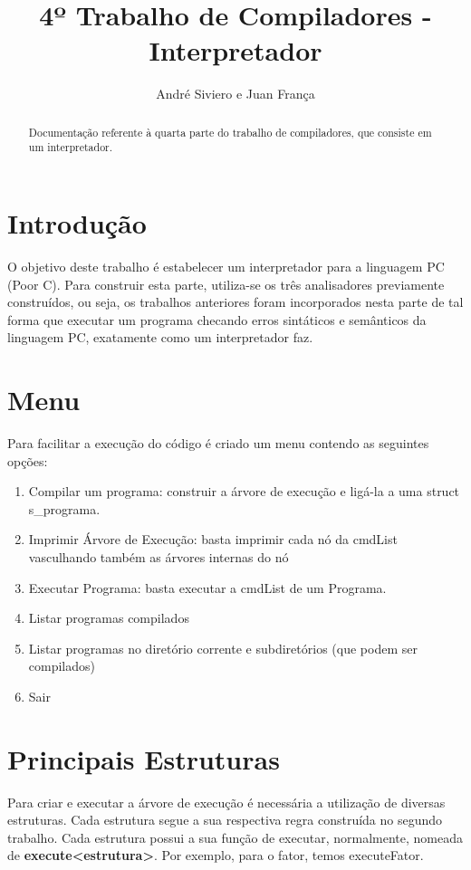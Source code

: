 \documentclass[a4paper,10pt]{article}
\title{4º Trabalho de Compiladores - Interpretador}
\author{André Siviero e Juan França}
\begin{document}
\maketitle

\begin{abstract}
Documentação referente à quarta parte do trabalho de compiladores, que consiste em um interpretador.
\end{abstract}

\section{Introdução}
O objetivo deste trabalho é estabelecer um interpretador para a linguagem PC (Poor C). Para construir esta parte, utiliza-se os três analisadores previamente construídos, ou seja,
os trabalhos anteriores foram incorporados nesta parte de tal forma que executar um programa checando erros sintáticos e semânticos da linguagem PC, exatamente como um interpretador faz.

\section{Menu}

Para facilitar a execução do código é criado um menu contendo as seguintes opções:

\begin{enumerate}
 \item Compilar um programa: construir a árvore de execução e ligá-la a uma struct s\_programa.
 \item Imprimir Árvore de Execução: basta imprimir cada nó da cmdList vasculhando também as árvores internas do nó
 \item Executar Programa: basta executar a cmdList de um Programa. 
 \item Listar programas compilados
 \item Listar programas no diretório corrente e subdiretórios (que podem ser compilados)
 \item Sair
\end{enumerate}

\section{Principais Estruturas}

Para criar e executar a árvore de execução é necessária a utilização de diversas estruturas. Cada estrutura segue a sua respectiva regra construída no segundo trabalho.
Cada estrutura possui a sua função de executar, normalmente, nomeada de \textbf{execute<estrutura>}. Por exemplo, para o fator, temos executeFator.
\end{document}
